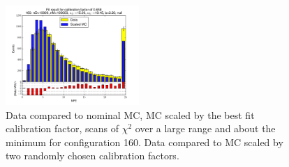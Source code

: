 \begin{figure}[htbp]
\begin{center}
\includegraphics[width=0.45\textwidth]{../FIGURES/160/FIG_Fit_result_for_calibration_factor_of_0_658.pdf} 
\caption{Data compared to nominal MC, MC scaled by the best fit calibration factor, scans of $\chi^2$ over a large range and about the minimum for configuration 160. Data compared to MC scaled by two randomly chosen calibration factors.} 
\label{tab:best_160} 
\end{center} \end{figure} 

